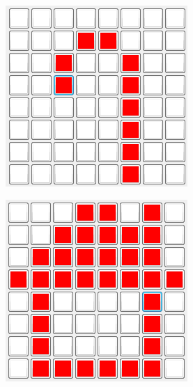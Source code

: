\documentclass[12pt, oneside]{article}
\begin{document}
\begin{figure}[h!]
\begin{subfigure}{0.45\textwidth}
    \end{subfigure}
    \begin{subfigure}{0.45\linewidth}
        \centering
        \includegraphics[width=\linewidth]{figs/baston.PNG}
    \end{subfigure}
    \begin{subfigure}{0.45\textwidth}
        \centering
        \includegraphics[width=\linewidth]{figs/casa.PNG}

\end{subfigure}
\end{figure}
\end{document}
